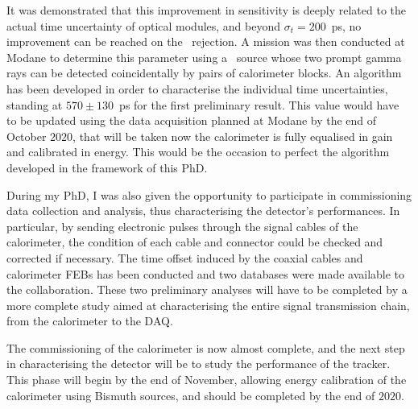 It was demonstrated that this improvement in sensitivity is deeply related to the actual time uncertainty of optical modules, and beyond $\sigma_{t}=200$~ps, no improvement can be reached on the \Tl\ rejection.
A mission was then conducted at Modane to determine this parameter using a \Co\ source whose two prompt gamma rays can be detected coincidentally by pairs of calorimeter blocks.
An algorithm has been developed in order to characterise the individual time uncertainties, standing at $570\pm130$~ps for the first preliminary result.
This value would have to be updated using the data acquisition planned at Modane by the end of October $2020$, that will be taken now the calorimeter is fully equalised in gain and calibrated in energy.
This would be the occasion to perfect the algorithm developed in the framework of this PhD.

During my PhD, I was also given the opportunity to participate in commissioning data collection and analysis, thus characterising the detector's performances.
In particular, by sending electronic pulses through the signal cables of the calorimeter, the condition of each cable and connector could be checked and corrected if necessary.
The time offset induced by the coaxial cables and calorimeter FEBs has been conducted and two databases were made available to the collaboration.
These two preliminary analyses will have to be completed by a more complete study aimed at characterising the entire signal transmission chain, from the calorimeter to the DAQ.

The commissioning of the calorimeter is now almost complete, and the next step in characterising the detector will be to study the performance of the tracker.
This phase will begin by the end of November, allowing energy calibration of the calorimeter using Bismuth sources, and should be completed by the end of $2020$.
